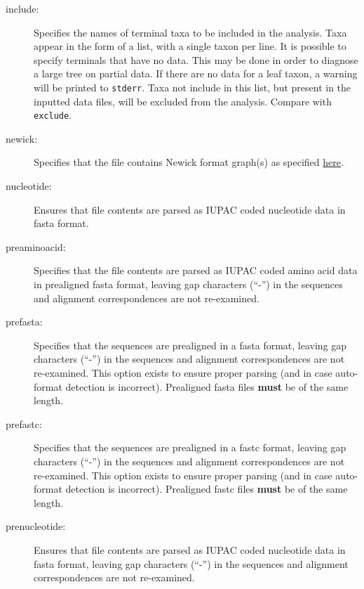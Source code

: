 \begin{description}
		\item [include:] Specifies the names of terminal taxa to be included in the analysis. 
		Taxa appear in the form of a list, with a single taxon per line. It is possible to specify 
		terminals that have no data. This may be done in order to diagnose a large tree on 
		partial data. If there are no data for a leaf taxon, a warning will be printed to \texttt{stderr}. 
		Taxa not include in this list, but present in the inputted data files, will be excluded from 
		the analysis. Compare with \texttt{exclude}.
			
		\item [newick:] Specifies that the file contains Newick format graph(s) as specified 
		\href{https://evolution.genetics.washington.edu/phylip/newick_doc.html}{here}.
			
		\item [nucleotide:] Ensures that file contents are parsed as IUPAC coded nucleotide data 
		in fasta \citep{PearsonandLipman1988} format.
			
		\item [preaminoacid:] Specifies that the file contents are parsed as IUPAC coded amino 
		acid data in  prealigned fasta \citep{PearsonandLipman1988} format, leaving 
		gap characters (``-'') in the sequences and alignment correspondences are not re-examined.
		
		\item [prefasta:] Specifies that the sequences are prealigned in a fasta format, leaving 
		gap characters (``-'') in the sequences and alignment correspondences are not re-examined. 
		This option exists to ensure proper parsing (and in case auto-format detection is incorrect).
		Prealigned fasta files \textbf{must} be of the same length.
			
		\item [prefastc:] Specifies that the sequences are prealigned in a fastc format, leaving gap 
		characters (``-'') in the sequences and alignment correspondences are not re-examined. 
		This option exists to ensure proper parsing (and in case auto-format detection is incorrect).
		Prealigned fastc files \textbf{must} be of the same length.			
		
		\item [prenucleotide:] Ensures that file contents are parsed as IUPAC coded nucleotide data 
		in fasta \citep{PearsonandLipman1988} format, leaving 
		gap characters (``-'') in the sequences and alignment correspondences are not re-examined.
		

\end{description}
